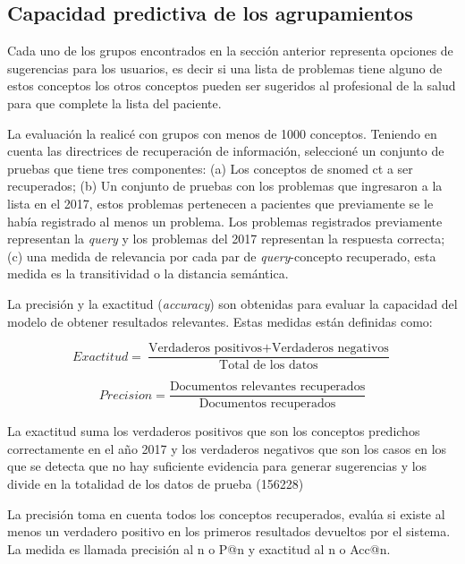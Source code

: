 \subsection{Capacidad predictiva de los agrupamientos}
Cada uno de los grupos encontrados en la sección anterior representa opciones de sugerencias para los usuarios, es decir si una lista de problemas tiene alguno de estos conceptos los otros conceptos pueden ser sugeridos al profesional de la salud para que complete la lista del paciente.

La evaluación la realicé con grupos con menos de 1000 conceptos. Teniendo en cuenta las directrices de recuperación de información, seleccioné un conjunto de pruebas que tiene tres componentes: (a) Los conceptos de snomed ct a ser recuperados; (b) Un conjunto de pruebas con los problemas que ingresaron a la lista en el 2017, estos problemas pertenecen a pacientes que previamente se le había registrado al menos un problema. Los problemas registrados previamente representan la \textit{query} y los problemas del 2017 representan la respuesta correcta; (c) una medida de relevancia por cada par de \textit{query}-concepto recuperado, esta medida es la transitividad o la distancia semántica\cite{Manning2008IntroductionRetrieval,Hersh1994OHSUMED:Research}.

La precisión y la exactitud (\textit{accuracy}) son obtenidas para evaluar la capacidad del modelo de obtener resultados relevantes. Estas medidas están definidas como:

\begin{equation}
Exactitud = \frac{\text{Verdaderos positivos}+\text{Verdaderos negativos}}{\text{Total de los datos}}
\end{equation}

\begin{equation}
Precision = \frac{\text{Documentos relevantes recuperados}}{\text{Documentos recuperados}}
\end{equation}

La exactitud suma los verdaderos positivos que son los conceptos predichos correctamente en el año 2017 y los verdaderos negativos que son los casos en los que se detecta que no hay suficiente evidencia para generar sugerencias y los divide en la totalidad de los datos de prueba (\num{156228})

La precisión toma en cuenta todos los conceptos recuperados, evalúa si existe al menos un verdadero positivo en los primeros resultados devueltos por el sistema. La medida es llamada precisión al n o P@n y exactitud al n o Acc@n.

